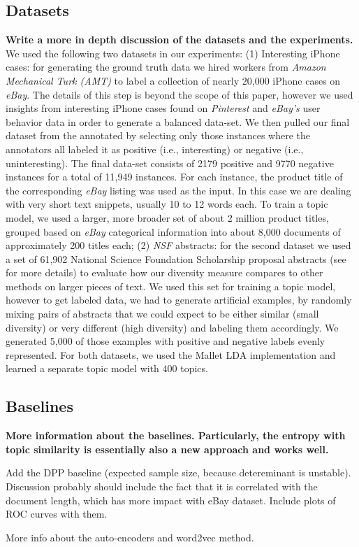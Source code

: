 \subsection{Datasets}
\label{sec:datasets}
{\bf Write a more in depth discussion of the datasets and the  experiments. }
We used the following two datasets in our experiments: (1) Interesting iPhone cases:
for generating the ground truth data we hired workers from {\em Amazon Mechanical Turk (AMT)} to label a collection
of nearly 20,000 iPhone cases on {\em eBay}. The details of this step is beyond the scope of this paper, however we used insights from
interesting iPhone cases found on {\em Pinterest} and {\em eBay's} user behavior data in order to generate a balanced data-set. 
We then pulled our final dataset from the annotated by selecting only those instances where the annotators all labeled it as
positive (i.e., interesting) or negative (i.e., uninteresting). The final data-set consists of 2179 positive and 9770 negative instances for
a total of 11,949 instances. For each instance, the product title of
the corresponding {\em eBay} listing was used as the input. In this case we are
dealing with very short text snippets, usually 10 to 12 words each. To
train a topic model, we used a larger, more broader set of about
2 million product titles, grouped based on {\em eBay} categorical information into about 8,000
documents of approximately 200 titles each; (2) {\em NSF}
abstracts: for the second dataset we used a set of 61,902 National Science Foundation
Scholarship proposal abstracts (see~\cite{bache:2013} for more details) to evaluate how our diversity measure
compares to other methods on larger pieces of text. We used this set
for training a topic model, however to get labeled data, we had to
generate artificial examples, by randomly mixing pairs of abstracts that we
could expect to be either similar (small diversity) or very different
(high diversity) and labeling them accordingly. We generated 5,000 of
those examples with positive and negative labels evenly represented. For both datasets, we used the Mallet LDA implementation and learned a separate topic model with $400$ topics.

\subsection{Baselines}
\label{sec:baselines}
{\bf More information about the baselines. Particularly, the entropy
  with topic similarity is essentially also a new approach and works
  well. 

Add the DPP baseline (expected sample size, because detereminant is
unstable). Discussion probably
should include the fact that it is correlated with the document
length, which has more impact with eBay dataset. Include plots of ROC
curves with them.

More info about the auto-encoders and word2vec method.}

